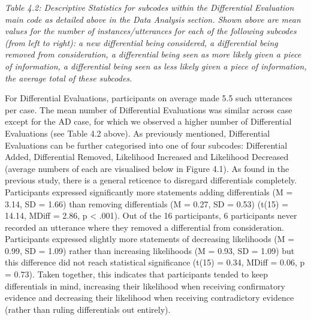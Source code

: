 \documentclass[a4paper, nobind]{templates/ociamthesis}
\begin{document}
\renewcommand*{\arraystretch}{1}

\emph{Table 4.2: Descriptive Statistics for subcodes within the Differential Evaluation main code as detailed above in the Data Analysis section. Shown above are mean values for the number of instances/utterances for each of the following subcodes (from left to right): a new differential being considered, a differential being removed from consideration, a differential being seen as more likely given a piece of information, a differential being seen as less likely given a piece of information, the average total of these subcodes.}

\hfill\break
For Differential Evaluations, participants on average made 5.5 such utterances per case. The mean number of Differential Evaluations was similar across case except for the AD case, for which we observed a higher number of Differential Evaluations (see Table 4.2 above). As previously mentioned, Differential Evaluations can be further categorised into one of four subcodes: Differential Added, Differential Removed, Likelihood Increased and Likelihood Decreased (average numbers of each are visualised below in Figure 4.1). As found in the previous study, there is a general reticence to disregard differentials completely. Participants expressed significantly more statements adding differentials (M = 3.14, SD = 1.66) than removing differentials (M = 0.27, SD = 0.53) (t(15) = 14.14, MDiff = 2.86, p \textless{} .001). Out of the 16 participants, 6 participants never recorded an utterance where they removed a differential from consideration. Participants expressed slightly more statements of decreasing likelihoods (M = 0.99, SD = 1.09) rather than increasing likelihoods (M = 0.93, SD = 1.09) but this difference did not reach statistical significance (t(15) = 0.34, MDiff = 0.06, p = 0.73). Taken together, this indicates that participants tended to keep differentials in mind, increasing their likelihood when receiving confirmatory evidence and decreasing their likelihood when receiving contradictory evidence (rather than ruling differentials out entirely).

\newpage
\end{document}
